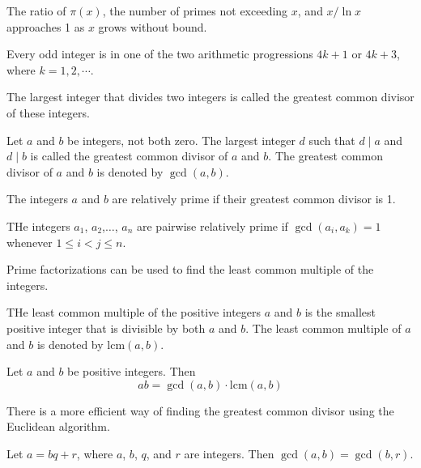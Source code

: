 \documentclass[../discrete.tex]{subfiles}
\begin{document}
\begin{theorem}
    The ratio of $\pi(x)$, the number of primes not exceeding $x$, and $x/\ln{x}$ approaches 
    1 as $x$ grows without bound.
\end{theorem}

Every odd integer is in one of the two arithmetic progressions $4k+1$ or $4k+3$, where $k=1,2,\cdots$. 

The largest integer that divides two integers is called the greatest common divisor of these integers.

\begin{definition}
    Let $a$ and $b$ be integers, not both zero. The largest integer $d$ such that $d\mid a$ and $d\mid b$ is called the greatest common divisor of 
    $a$ and $b$. The greatest common divisor of $a$ and $b$ is denoted by $\gcd(a,b)$.
\end{definition}

\begin{definition}
    The integers $a$ and $b$ are relatively prime if their greatest common divisor is 1.
\end{definition}

\begin{definition}
    THe integers $a_1$, $a_2$,$\dots$, $a_n$ are pairwise relatively prime if $\gcd(a_i,a_k)=1$ whenever $1\leq i<j\leq n$.
\end{definition}

Prime factorizations can be used to find the least common multiple of the integers.
\begin{definition}
    THe least common multiple of the positive integers $a$ and $b$ is the smallest positive 
    integer that is divisible by both $a$ and $b$. The least common multiple of $a$ and $b$ is denoted by $\text{lcm}(a,b)$.
\end{definition}

\begin{theorem}
    Let $a$ and $b$ be positive integers. Then
    \[ab=\gcd(a,b)\cdot \text{lcm}(a,b)\]
\end{theorem}

There is a more efficient way of finding the greatest common divisor using the Euclidean algorithm.

\begin{lemma}
    Let $a=bq+r$, where $a$, $b$, $q$, and $r$ are integers. Then $\gcd(a,b)=\gcd(b,r)$.
\end{lemma}
\end{document}
